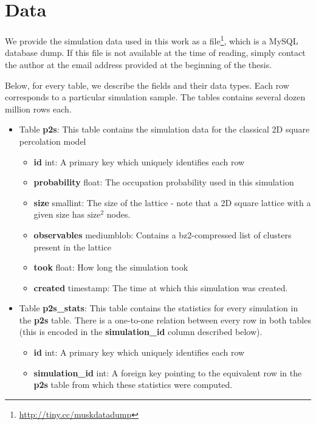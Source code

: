 \clearpage

\clearpage

\chapter{Data}
We provide the simulation data used in this work as a  file\footnote{\url{http://tiny.cc/muskdatadump}}, which is a MySQL database dump. If this file is not available at the time of reading, simply contact the author at the email address provided at the beginning of the thesis.


Below, for every table, we describe the fields and their data types. Each row corresponds to a particular simulation sample. The tables contains several dozen million rows each.

\begin{itemize}
    \item Table \textbf{p2s}: This table contains the simulation data for the classical 2D square percolation model
    \begin{itemize}
        \item \textbf{id} int: A primary key which uniquely identifies each row
        \item \textbf{probability} float: The occupation probability used in this simulation
        \item \textbf{size} smallint: The size of the lattice - note that a 2D square lattice with a given size has $\textrm{size}^2$ nodes.
        \item \textbf{observables} mediumblob: Contains a bz2-compressed list of clusters present in the lattice
        \item \textbf{took} float: How long the simulation took
        \item \textbf{created} timestamp: The time at which this simulation was created.
    \end{itemize}
    \item Table \textbf{p2s\_stats}: This table contains the statistics for every simulation in the \textbf{p2s} table. There is a one-to-one relation between every row in both tables (this is encoded in the \textbf{simulation\_id} column described below).
    \begin{itemize}
        \item \textbf{id} int: A primary key which uniquely identifies each row
        \item \textbf{simulation\_id} int: A foreign key pointing to the equivalent row in the \textbf{p2s} table from which these statistics were computed.

\end{itemize}
\end{itemize}
